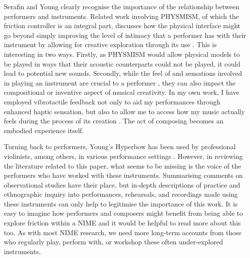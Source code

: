 Serafin and Young clearly recognise the importance of the relationship between performers and instruments. Related work involving PHYSMISM, of which the friction controller is an integral part, discusses how the physical interface might go beyond simply improving the level of intimacy that a performer has with their instrument by allowing for creative exploration through its use \cite{Gelineck:2010}. This is interesting in two ways. Firstly, as PHYSMISM would allow physical models to be played in ways that their acoustic counterparts could not be played, it could lead to potential new sounds. Secondly, while the feel of and sensations involved in playing an instrument are crucial to a performer \cite{Essl:2006}, they can also impact the compositional or inventive aspect of musical creativity. In my own work, I have employed vibrotactile feedback not only to aid my performances through enhanced haptic sensation, but also to allow me to access how my music actually feels during the process of its creation \cite{Hayes:2013}. The act of composing becomes an embodied experience itself.

Turning back to performers, Young's Hyperbow has been used by professional violinists, among others, in various performance settings \cite{Young:2002a}. However, in reviewing the literature related to this paper, what seems to be missing is the voice of the performers who have worked with these instruments. Summarising comments on observational studies have their place, but in-depth descriptions of practice and ethnographic inquiry into performances, rehearsals, and recordings made using these instruments can only help to legitimise the importance of this work. It is easy to imagine how performers and composers might benefit from being able to explore friction within a NIME and it would be helpful to read more about this too. As with most NIME research, we need more long-term accounts from those who regularly play, perform with, or workshop these often under-explored instruments.

